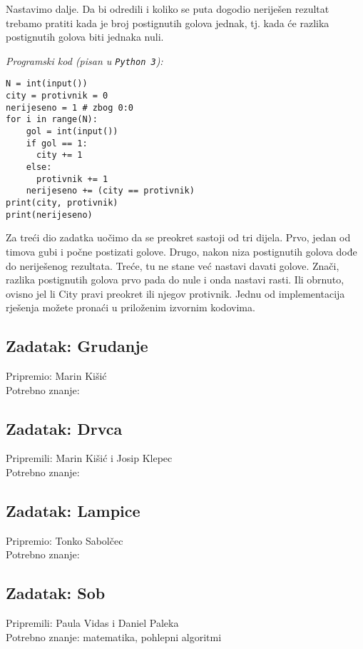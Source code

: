\documentclass[a4paper]{article}
\begin{document}
Nastavimo dalje. Da bi odredili i koliko se puta dogodio neriješen rezultat
trebamo pratiti kada je broj postignutih golova jednak, tj. kada će razlika
postignutih golova biti jednaka nuli.

\textit{Programski kod (pisan u \texttt{Python 3}):}

\vspace{-2ex}
\begin{verbatim}
N = int(input())
city = protivnik = 0
nerijeseno = 1 # zbog 0:0
for i in range(N):
    gol = int(input())
    if gol == 1:
      city += 1
    else:
      protivnik += 1
    nerijeseno += (city == protivnik)
print(city, protivnik)
print(nerijeseno)
\end{verbatim}

Za treći dio zadatka uočimo da se preokret sastoji od tri dijela. Prvo, jedan
od timova gubi i počne postizati golove. Drugo, nakon niza postignutih golova
dođe do neriješenog rezultata. Treće, tu ne stane već nastavi davati golove.
Znači, razlika postignutih golova prvo pada do nule i onda nastavi rasti. Ili
obrnuto, ovisno jel li City pravi preokret ili njegov protivnik. Jednu od
implementacija rješenja možete pronaći u priloženim izvornim kodovima.

\subsection*{Zadatak: Grudanje}
\textsf{Pripremio: Marin Kišić}\\
\textsf{Potrebno znanje: }

\subsection*{Zadatak: Drvca}
\textsf{Pripremili: Marin Kišić i Josip Klepec}\\
\textsf{Potrebno znanje: }

\subsection*{Zadatak: Lampice}
\textsf{Pripremio: Tonko Sabolčec}\\
\textsf{Potrebno znanje: }

\subsection*{Zadatak: Sob}
\textsf{Pripremili: Paula Vidas i Daniel Paleka}\\
\textsf{Potrebno znanje: matematika, pohlepni algoritmi}
\end{document}
